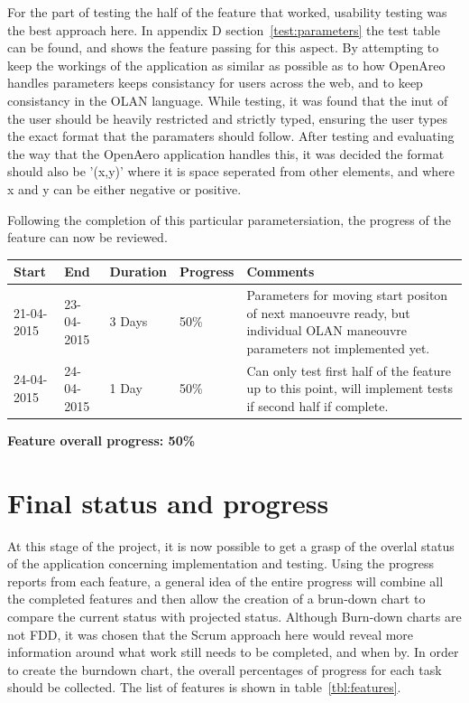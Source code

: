 For the part of testing the half of the feature that worked, usability testing was the best approach here. In appendix D section~\ref{test:parameters} the test table can be found, and shows the feature passing for this aspect. By attempting to keep the workings of the application as similar as possible as to how OpenAreo handles parameters keeps consistancy for users across the web, and to keep consistancy in the OLAN language. While testing, it was found that the inut of the user should be heavily restricted and strictly typed, ensuring the user types the exact format that the paramaters should follow. After testing and evaluating the way that the OpenAero application handles this, it was decided the format should also be '(x,y)' where it is space seperated from other elements, and where x and y can be either negative or positive.

Following the completion of this particular parametersiation, the progress of the feature can now be reviewed.

\begin{table}[h]
\begin{tabular}{|l|l|l|l|p{7cm}|}
\hline
\textbf{Start} & \textbf{End} & \textbf{Duration} & \textbf{Progress} & \textbf{Comments}                                                                                                     \\ \hline
21-04-2015     & 23-04-2015   & 3 Days            & 50\%             &  Parameters for moving start positon of next manoeuvre ready, but individual OLAN maneouvre parameters not implemented yet.\\ \hline
24-04-2015     & 24-04-2015   & 1 Day            & 50\%             &  Can only test first half of the feature up to this point, will implement tests if second half if complete.\\ \hline
\end{tabular}
\end{table}

\textbf{Feature overall progress: 50\%}

\section{Final status and progress}
At this stage of the project, it is now possible to get a grasp of the overlal status of the application concerning implementation and testing. Using the progress reports from each feature, a general idea of the entire progress will combine all the completed features and then allow the creation of a brun-down chart to compare the current status with projected status. Although Burn-down charts are not FDD, it was chosen that the Scrum approach here would reveal more information around what work still needs to be completed, and when by. In order to create the burndown chart, the overall percentages of progress for each task should be collected. The list of features is shown in table~\ref{tbl:features}.

